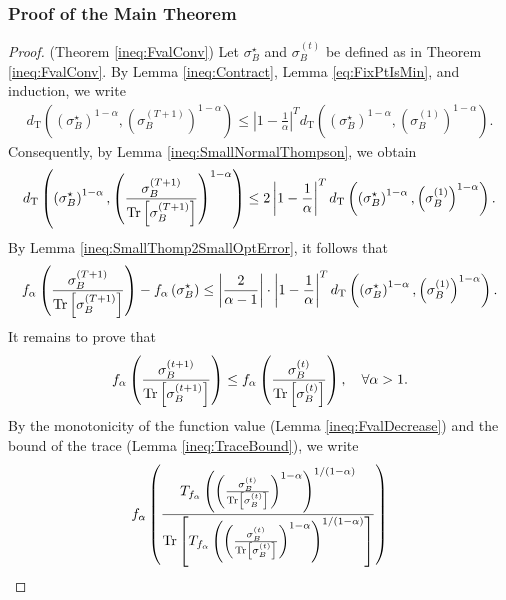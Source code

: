 \documentclass{article}
\begin{document}
\subsubsection{Proof of the Main Theorem}
\label{subsec:PfMainThm}
\begin{proof}(Theorem \ref{ineq:FvalConv})
    Let $\sigma_B^{\star}$ and $\sigma_B^{(t)}$ be defined as in Theorem \ref{ineq:FvalConv}.
    By Lemma \ref{ineq:Contract}, Lemma \ref{eq:FixPtIsMin}, and induction, we write
    \begin{align}
        d_{\mathrm{T}}\left(\left(\sigma_B^{\star}\right)^{1-\alpha},\left(\sigma_B^{(T+1)}\right)^{1-\alpha}\right) 
        \leq\left|1-\frac{1}{\alpha}\right|^T d_{\mathrm{T}}\left(\left(\sigma_B^{\star}\right)^{1-\alpha},\left(\sigma_B^{(1)}\right)^{1-\alpha}\right).
    \end{align}
    Consequently, by Lemma \ref{ineq:SmallNormalThompson}, we obtain
    \begin{align}
        d_{\mathrm{T}}\left(\left(\sigma_B^{\star}\right)^{1-\alpha},\left(\frac{\sigma_B^{(T+1)}}{\Tr\left[\sigma_B^{(T+1)}\right]}\right)^{1-\alpha}\right) 
        \leq 2\left|1-\frac{1}{\alpha}\right|^T d_{\mathrm{T}}\left(\left(\sigma_B^{\star}\right)^{1-\alpha},\left(\sigma_B^{(1)}\right)^{1-\alpha}\right).
    \end{align}
    By Lemma \ref{ineq:SmallThomp2SmallOptError}, it follows that
    \begin{align}
        f_{\alpha}\left(\frac{\sigma_B^{(T+1)}}{\Tr\left[\sigma_B^{(T+1)}\right]}\right)-f_{\alpha}\left(\sigma_B^{\star}\right)
        \leq \left|\frac{2}{\alpha-1}\right|\cdot \left|1-\frac{1}{\alpha}\right|^T d_{\mathrm{T}}\left(\left(\sigma_B^{\star}\right)^{1-\alpha},\left(\sigma_B^{(1)}\right)^{1-\alpha}\right).
    \end{align}
    It remains to prove that
    \begin{align}
        f_{\alpha}\left(\frac{\sigma_B^{(t+1)}}{\Tr\left[\sigma_B^{(t+1)}\right]}
        \right)
        \leq f_{\alpha}\left(\frac{\sigma_B^{(t)}}{\Tr\left[\sigma_B^{(t)}\right]}\right),\quad\forall\alpha>1.
    \end{align} 
    By the monotonicity of the function value (Lemma \ref{ineq:FvalDecrease}) and the bound of the trace (Lemma \ref{ineq:TraceBound}), we write
    \begin{align}
        &f_{\alpha}\left(\frac{T_{f_{\alpha}}\left(\left(\frac{\sigma_B^{(t)}}{\Tr\left[\sigma_B^{(t)}\right]}\right)^{1-\alpha}\right)^{1/(1-\alpha)}}{\Tr\left[T_{f_{\alpha}}\left(\left(\frac{\sigma_B^{(t)}}{\Tr\left[\sigma_B^{(t)}\right]}\right)^{1-\alpha}\right)^{1/(1-\alpha)}\right]}\right)\\

\end{align}
\end{proof}
\end{document}
